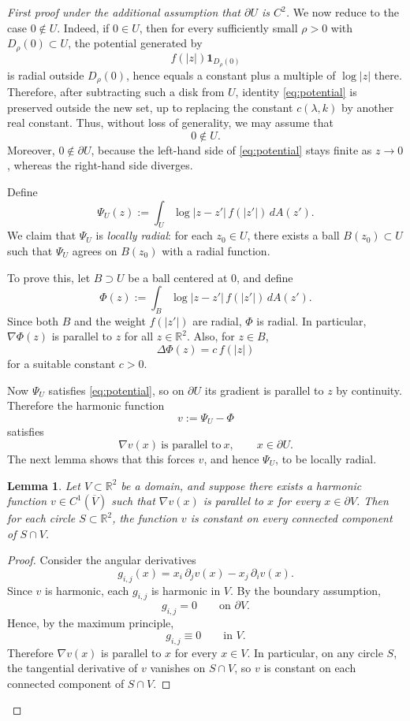 \documentclass[a4paper,11pt,reqno]{amsart}
\numberwithin{equation}{section}
\theoremstyle{plain} %
\newtheorem{lemma}{Lemma}[section]
\theoremstyle{definition} %
\theoremstyle{remark}
\newcommand{\R}{\mathbb{R}}
\begin{document}
\begin{proof}[First proof under the additional assumption that \(\partial U\) is \(C^2\)]
We now reduce to the case $0\notin U$. Indeed, if $0\in U$, then for every sufficiently small $\rho>0$ with $D_\rho(0)\subset U$, the potential generated by
\[
f(|z|)\mathbf{1}_{D_\rho(0)}
\]
is radial outside $D_\rho(0)$, hence equals a constant plus a multiple of $\log|z|$ there. Therefore, after subtracting such a disk from $U$, identity \eqref{eq:potential} is preserved outside the new set, up to replacing the constant $c(\lambda,k)$ by another real constant. Thus, without loss of generality, we may assume that
\[
0\notin U.
\]
Moreover, $0\notin \partial U$, because the left-hand side of \eqref{eq:potential} stays finite as $z\to 0$, whereas the right-hand side diverges.

Define
\[
\Psi_U(z):=\int_U \log|z-z'|\,f(|z'|)\,dA(z').
\]
We claim that $\Psi_U$ is \emph{locally radial}: for each $z_0\in U$, there exists a ball $B(z_0)\subset U$ such that $\Psi_U$ agrees on $B(z_0)$ with a radial function.

To prove this, let $B\supset U$ be a ball centered at $0$, and define
\[
\Phi(z):=\int_B \log|z-z'|\,f(|z'|)\,dA(z').
\]
Since both $B$ and the weight $f(|z'|)$ are radial, $\Phi$ is radial. In particular, $\nabla \Phi(z)$ is parallel to $z$ for all $z\in \R^2$. Also, for $z\in B$,
\[
\Delta \Phi(z)=c\,f(|z|)
\]
for a suitable constant $c>0$.

Now $\Psi_U$ satisfies \eqref{eq:potential}, so on $\partial U$ its gradient is parallel to $z$ by continuity. Therefore the harmonic function
\[
v:=\Psi_U-\Phi
\]
satisfies
\[
\nabla v(x)\ \text{is parallel to}\ x,\qquad x\in \partial U.
\]
The next lemma shows that this forces $v$, and hence $\Psi_U$, to be locally radial.

\begin{lemma}
Let $V\subset \R^2$ be a domain, and suppose there exists a harmonic function
$v\in C^1(\overline{V})$ such that $\nabla v(x)$ is parallel to $x$ for every $x\in \partial V$. Then for each circle $S\subset \R^2$, the function $v$ is constant on every connected component of $S\cap V$.
\end{lemma}

\begin{proof}
Consider the angular derivatives
\[
g_{i,j}(x)=x_i\,\partial_j v(x)-x_j\,\partial_i v(x).
\]
Since $v$ is harmonic, each $g_{i,j}$ is harmonic in $V$. By the boundary assumption,
\[
g_{i,j}=0 \qquad \text{on } \partial V.
\]
Hence, by the maximum principle,
\[
g_{i,j}\equiv 0 \qquad \text{in } V.
\]
Therefore $\nabla v(x)$ is parallel to $x$ for every $x\in V$. In particular, on any circle $S$, the tangential derivative of $v$ vanishes on $S\cap V$, so $v$ is constant on each connected component of $S\cap V$.
\end{proof}


\end{proof}
\end{document}
